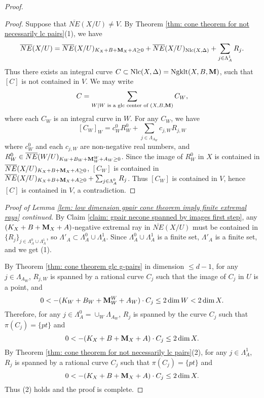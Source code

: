 \documentclass[11pt]{amsart}
\numberwithin{equation}{section}
\newcommand{\Mm}{{\bf{M}}}
\newcommand{\Ngklt}{\operatorname{Ngklt}}
\newcommand{\Nlc}{\operatorname{Nlc}}
\theoremstyle{definition}
\theoremstyle{definition}
\theoremstyle{definition}
\begin{document}
\begin{proof}
\begin{proof}
Suppose that $\overline{NE}(X/U)\not=V.$ By Theorem \ref{thm: cone theorem for not necessarily lc pairs}(1), we have
$$\overline{NE}(X/U)=\overline{NE}(X/U)_{K_X+B+\Mm_X+A\geq 0}+\overline{NE}(X/U)_{\Nlc(X,\Delta)}+\sum_{j\in\Lambda^1_A}R_j.$$
Thus there exists an integral curve $C\subset\Nlc(X,\Delta)=\Ngklt(X,B,\Mm)$, such that $[C]$ is not contained in $V$. We may write 
$$C=\sum_{W\mid W\text{ is a glc center of }(X,B,\Mm)}C_W,$$ 
where each $C_W$ is an integral curve in $W$. For any $C_W$, we have
$$[C_W]_W=c^0_{W}R^0_W+\sum_{j\in\Lambda_{A_W}}c_{j,W}R_{j,W}$$
where $c^0_{W}$ and each $c_{j,W}$ are non-negative real numbers, and $R_W^0\in \overline{NE}(W/U)_{K_W+B_W+\Mm^W_W+A_W\geq 0}$. Since the image of $R^0_W$ in $X$ is contained in $\overline{NE}(X/U)_{K_X+B+\Mm_X+A\geq 0}$, $[C_W]$ is contained in $\overline{NE}(X/U)_{K_X+B+\Mm_X+A\geq 0}+\sum_{j\in\Lambda^0_A}R_j$. Thus $[C_W]$ is contained in $V$, hence $[C]$ is contained in $V$, a contradiction.  
\end{proof}
\noindent\textit{Proof of Lemma \ref{lem: low dimension gpair cone theorem imply finite extremal rays} continued}. By Claim \ref{claim: gpair necone spanned by images first step}, any $(K_X+B+\Mm_X+A)$-negative extremal ray in $\overline{NE}(X/U)$ must be contained in $\{R_j\}_{j\in\Lambda^0_A\cup\Lambda^1_A}$, so $\Lambda'_A\subset\Lambda^0_A\cup\Lambda^1_A$. Since $\Lambda^0_A\cup\Lambda^1_A$ is a finite set, $\Lambda'_A$ is a finite set, and we get (1).

By Theorem \ref{thm: cone theorem glc g-pairs} in dimension $\leq d-1$, for any $j\in\Lambda_{A_W}$, $R_{j,W}$ is spanned by a rational curve $C_j$ such that the image of $C_j$ in $U$ is a point, and
$$0<-(K_W+B_W+\Mm^W_W+A_W)\cdot C_j\leq 2\dim W<2\dim X.$$
Therefore, for any $j\in\Lambda^0_A=\cup_W\Lambda_{A_W}$, $R_j$ is spanned by the curve $C_j$ such that $\pi(C_j)=\{pt\}$ and
$$0<-(K_X+B+\Mm_X+A)\cdot C_j\leq 2\dim X.$$
By Theorem \ref{thm: cone theorem for not necessarily lc pairs}(2), for any $j\in\Lambda^1_A$, $R_j$ is spanned by a rational curve $C_j$ such that $\pi(C_j)=\{pt\}$ and
$$0<-(K_X+B+\Mm_X+A)\cdot C_j\leq 2\dim X.$$
 Thus (2) holds and the proof is complete.
\end{proof}
\end{document}
